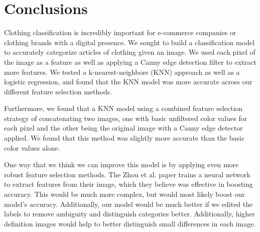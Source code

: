 
\section{Conclusions}
\label{sec:concl}

Clothing classification is incredibly important for e-commerce companies or clothing brands with a digital presence. We sought to build a classification model to accurately categorize articles of clothing given an image. We used each pixel of the image as a feature as well as applying a Canny edge detection filter to extract more features. We tested a k-nearest-neighbors (KNN) approach as well as a logistic regression, and found that the KNN model was more accurate across our different feature selection methods.

Furthermore, we found that a KNN model using a combined feature selection strategy of concatenating two images, one with basic unfiltered color values for each pixel and the other being the original image with a Canny edge detector applied. We found that this method was slightly more accurate than the basic color values alone. 

One way that we think we can improve this model is by applying even more robust feature selection methods. The Zhou et al. paper trains a neural network to extract features from their image, which they believe was effective in boosting accuracy. This would be much more complex, but would most likely boost our model's accuracy. Additionally, our model would be much better if we edited the labels to remove ambiguity and distinguish categories better. Additionally, higher definition images would help to better distinguish small differences in each image.
